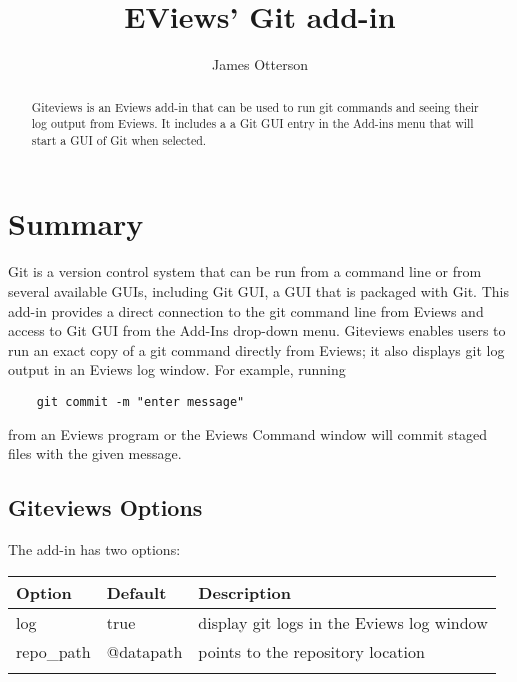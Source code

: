 \documentclass{article}
\title{EViews' Git add-in}
\author{James Otterson}
\begin{document}
\maketitle

\renewcommand{\abstractname}{Overview}
\begin{abstract}
    Giteviews is an Eviews add-in that can be used to run git commands and seeing their log output from Eviews.  It includes a 
    a Git GUI entry in the Add-ins menu that will start a GUI of Git when selected.
\end{abstract}

\section{Summary}

Git is a version control system that can be run from a command line or from several available GUIs, including Git GUI, a GUI that is packaged with Git.  This add-in 
provides a direct connection to the git command line from Eviews and access to Git GUI from the Add-Ins drop-down menu.  Giteviews enables users to run 
an exact copy of a git command directly from Eviews; it also displays git log output in an Eviews log window.  For example, running
 
\begin{verbatim}
    git commit -m "enter message"
\end{verbatim}

\noindent from an Eviews program or the Eviews Command window will commit staged files with the given message.  

\subsection{Giteviews Options}
  
  The add-in has two options: 
  \begin{table}[h!]
  \centering
  \begin{tabular}{lll} \hline \hline
    Option          & Default       & Description \\ \hline
    log             & true          & display git logs in the Eviews log window \\
    repo\_path      & @datapath     & points to the repository location \\ \hline \hline \\
  \end{tabular}
  \end{table}
\end{document}
